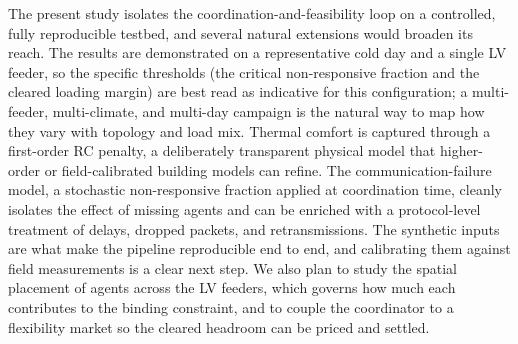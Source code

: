 The present study isolates the coordination-and-feasibility loop on a controlled,
fully reproducible testbed, and several natural extensions would broaden its reach.
The results are demonstrated on a representative cold day and a single LV feeder,
so the specific thresholds (the critical non-responsive fraction and the cleared
loading margin) are best read as indicative for this configuration; a
multi-feeder, multi-climate, and multi-day campaign is the natural way to map how
they vary with topology and load mix. Thermal comfort is captured through a
first-order RC penalty, a deliberately transparent physical model that higher-order
or field-calibrated building models can refine. The communication-failure model, a
stochastic non-responsive fraction applied at coordination time, cleanly isolates
the effect of missing agents and can be enriched with a protocol-level treatment of
delays, dropped packets, and retransmissions. The synthetic inputs are what make
the pipeline reproducible end to end, and calibrating them against field
measurements is a clear next step. We also plan to study the spatial placement of
agents across the LV feeders, which governs how much each contributes to the
binding constraint, and to couple the coordinator to a flexibility market so the
cleared headroom can be priced and settled.
